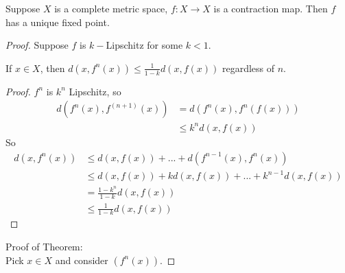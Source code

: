 \documentclass[a4paper]{article}
\begin{document}
\begin{thm}
Suppose $X$ is a complete metric space, $f:X\to X$ is a contraction map. Then $f$ has a unique fixed point.
\begin{proof}
Suppose $f$ is $k-$Lipschitz for some $k<1$.
\begin{lemma}
If $x \in X$, then $d\left(x,f^n\left(x\right)\right) \leq \frac{1}{1-k} d\left(x,f\left(x\right)\right)$ regardless of $n$.
\begin{proof}
$f^n$ is $k^n$ Lipschitz, so
\begin{equation*}
\begin{aligned}
d\left(f^n\left(x\right),f^{(n+1)}\left(x\right)\right) &= d\left(f^n\left(x\right),f^n\left(f\left(x\right)\right)\right)\\ &\leq k^n d\left(x,f\left(x\right)\right)
\end{aligned}
\end{equation*}
So
\begin{equation*}
\begin{aligned}
d\left(x,f^n\left(x\right)\right) & \leq d\left(x,f\left(x\right)\right)+...+d\left(f^{n-1}\left(x\right),f^n\left(x\right)\right)\\
&\leq d\left(x,f\left(x\right)\right)+kd\left(x,f\left(x\right)\right)+...+k^{n-1}d\left(x,f\left(x\right)\right)\\
&=\frac{1-k^n}{1-k}d\left(x,f\left(x\right)\right)\\
&\leq \frac{1}{1-k}d\left(x,f\left(x\right)\right)
\end{aligned}
\end{equation*}
\end{proof}
\end{lemma}
Proof of Theorem:\\
Pick $x \in X$ and consider $\left(f^n\left(x\right)\right)$.


\end{proof}
\end{thm}
\end{document}
